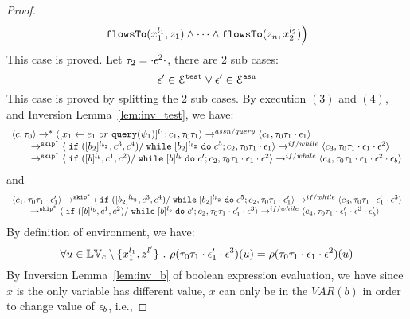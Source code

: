 \begin{proof}
\[  \mathtt{flowsTo}(x_1^{l_1}, z_1) 
  \land \cdots \land \mathtt{flowsTo}(z_n, x_2^{l_2}) \Big)
 \]
 This case is proved.
%
 Let $\mathtt{\tau}_2 = \cdot \mathtt{\epsilon}^2 \cdot$, there are 2 sub cases: 
 \[
 \mathtt{\epsilon}' \in \mathcal{E}^{\mathtt{{test}}} \lor \mathtt{\epsilon}' \in \mathcal{E}^{\mathtt{{asn}}}
 \]
 This case is proved by splitting the 2 sub cases.
 \subcaseL{$\event^2 \in \eventset^{\test}$}
By execution $(3)$ and $(4)$, and {Inversion Lemma~\ref{lem:inv_test}}, we have:
%
\[
  \begin{array}{l}   
  \langle {c}, \mathtt{\tau}_0 \rangle 
  \rightarrow^{*} 
  \langle [\mathrel{ {x}_1 \leftarrow e_1~ or ~ {\tt query}(\psi_1) }]^{l_1} ; {c}_1, \mathtt{\tau}_0 \mathtt{\tau}_1 \rangle  \rightarrow^{assn/query}
 \langle c_1, \mathtt{\tau}_0 \mathtt{\tau}_1 \cdot \mathtt{\epsilon}_1 \rangle 
  \\ 
  \qquad \rightarrow^{\mathtt{skip}^*} 
  \langle \;\mathtt{if}\;([b_2]{}^{l_{b_2}}, c^3, c^4) / \;\mathtt{while}\; [b_2]{}^{l_{b_2}} \;\mathtt{do}\; c^5; {c}_2, 
  \mathtt{\tau}_0 \mathtt{\tau}_1 \cdot \mathtt{\epsilon}_1 \rangle 
  \rightarrow^{if / while} 
  \langle {c}_3,  \mathtt{\tau}_0 \mathtt{\tau}_1 \cdot \mathtt{\epsilon}_1 \cdot \mathtt{\epsilon}^2 \rangle 
  \\ 
  \qquad \rightarrow^{\mathtt{skip}^*} 
  \langle \;\mathtt{if}\;([b]{}^{l_b}, c^1, c^2) / \;\mathtt{while}\; [b]{}^{l_b} \;\mathtt{do}\; c'; {c}_2, 
  \mathtt{\tau}_0 \mathtt{\tau}_1 \cdot \mathtt{\epsilon}_1\cdot \mathtt{\epsilon}^2 \rangle 
  \rightarrow^{if / while} 
  \langle {c}_4,  \mathtt{\tau}_0 \mathtt{\tau}_1 \cdot \mathtt{\epsilon}_1 \cdot \mathtt{\epsilon}^2 \cdot \mathtt{\epsilon}_b \rangle 
\end{array}
 \]
and 
 \[
  \begin{array}{l}   
  \langle c_1, \mathtt{\tau}_0 \mathtt{\tau}_1 \cdot \mathtt{\epsilon}_1' \rangle 
 \rightarrow^{\mathtt{skip}^*} 
  \langle \;\mathtt{if}\;([b_2]{}^{l_{b_2}}, c^3, c^4) / \;\mathtt{while}\; [b_2]{}^{l_{b_2}} \;\mathtt{do}\; c^5; {c}_2, 
  \mathtt{\tau}_0 \mathtt{\tau}_1 \cdot \mathtt{\epsilon}_1' \rangle 
  \rightarrow^{if / while} 
  \langle {c}_3,  \mathtt{\tau}_0 \mathtt{\tau}_1 \cdot \mathtt{\epsilon}_1' \cdot \mathtt{\epsilon}^3 \rangle 
  \\ 
  \qquad \rightarrow^{\mathtt{skip}^*} 
  \langle \;\mathtt{if}\;([b]{}^{l_b}, c^1, c^2) / \;\mathtt{while}\; [b]{}^{l_b} \;\mathtt{do}\; c'; {c}_2, 
  \mathtt{\tau}_0 \mathtt{\tau}_1 \cdot \mathtt{\epsilon}_1' \cdot \mathtt{\epsilon}^3 \rangle 
  \rightarrow^{if / while} 
  \langle {c}_4,  \mathtt{\tau}_0 \mathtt{\tau}_1 \cdot \mathtt{\epsilon}_1' \cdot \mathtt{\epsilon}^3 \cdot \mathtt{\epsilon}_b' \rangle 
\end{array}
 \]
 By definition of environment, we have:
\[
  \forall u \in \mathbb{LV}_c \setminus \{x_1^{l_1}, z^{l'}\} ~.~
  \rho(\mathtt{\tau}_0 \mathtt{\tau}_1 \cdot \mathtt{\epsilon}_1' \cdot \mathtt{\epsilon}^3) (u) =  
  \rho(\mathtt{\tau}_0 \mathtt{\tau}_1 \cdot \mathtt{\epsilon}_1 \cdot \mathtt{\epsilon}^2) (u)
\]
%
By {Inversion Lemma~\ref{lem:inv_b}} of boolean expression evaluation, we have since $x$ is the only variable has different value, $x$ can only be in the $VAR(b)$ in order to change value of $\mathtt{\epsilon}_b$, i.e.,

\end{proof}
